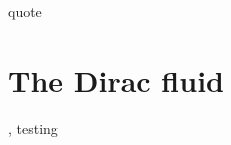 \begin{savequote}[75mm]
quote
\end{savequote}

\chapter{The Dirac fluid}
\label{ch:the_dirac_fluid}

, testing

